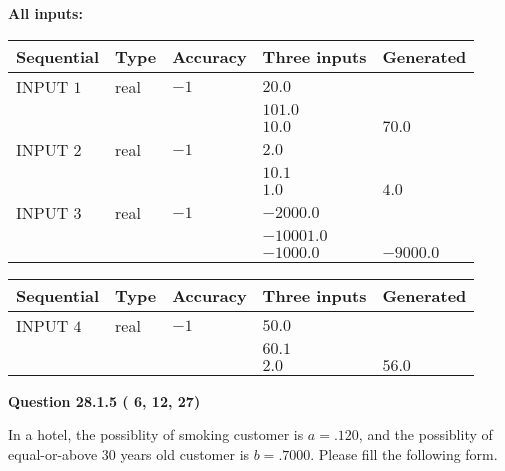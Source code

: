 \documentclass[12pt]{article}
\begin{document}
   
   
   
\noindent\vspace{0.1in}\hspace{-0.08in} {\textbf{\Large{All inputs: }}}
   
   
  
  
\noindent\begin{tabular}{|l|l|l|l|l|}
\hline
 Sequential & Type & Accuracy & Three inputs & Generated \\ 
\hline
 
 
  INPUT $           1$ & real & $          -1 $ & $
 20.0
  $ & \\
  & & &  $
 101.0
  $ & \\
  & & &  $
 10.0
 $ & $ 70.0 $ 
 \\  \hline  
 
 
  INPUT $           2$ & real & $          -1 $ & $
 2.0
  $ & \\
  & & &  $
 10.1
  $ & \\
  & & &  $
 1.0
 $ & $ 4.0 $ 
 \\  \hline  
 
 
  INPUT $           3$ & real & $          -1 $ & $
 -2000.0
  $ & \\
  & & &  $
 -10001.0
  $ & \\
  & & &  $
 -1000.0
 $ & $ -9000.0 $ 
 \\  \hline  
 \end{tabular}
   
   
  
  
\noindent\begin{tabular}{|l|l|l|l|l|}
\hline
 Sequential & Type & Accuracy & Three inputs & Generated \\ 
\hline
 
 
  INPUT $           4$ & real & $          -1 $ & $
 50.0
  $ & \\
  & & &  $
 60.1
  $ & \\
  & & &  $
 2.0
 $ & $ 56.0 $ 
 \\  \hline  
 \end{tabular}
   
   
  
\vspace{0.2in}
  
{\textbf{\Large{Question
28.1.5 
 (          6,         12,         27)
}}}
  
  
In a hotel, the possiblity of  %
smoking customer is
$a =  %
.120$, and the possiblity of  %
equal-or-above 30 years old customer is $ b =  %
.7000$.
Please fill the following form.
 
\end{document}
